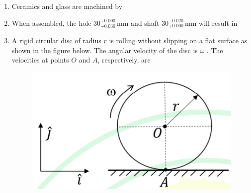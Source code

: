 \documentclass[journal]{IEEEtran}
\begin{document}
\begin{enumerate}[leftmargin=0pt]
\item
Ceramics and glass are machined by

\vspace{0.2cm}
\begin{enumerate}
\end{enumerate}
\hfill{}

\item
When assembled, the hole $30^{+0.000}_{+0.030}\,\text{mm}$ and shaft $30^{-0.020}_{+0.000}\,\text{mm}$ will result in

\vspace{0.2cm}
\begin{enumerate}
\end{enumerate}
\hfill{}

\item
A rigid circular disc of radius $r$  is rolling without slipping on a flat surface as shown in the figure below. The angular velocity of the disc is $\omega$ . The velocities  at points $O$ and $A$, respectively, are
\begin{figure}[H]\includegraphics[width=0.5\columnwidth]{Figs/image (98).png}\caption*{}\label{fig:q26}\end{figure}
\vspace{0.2cm}
\begin{enumerate}
\end{enumerate}
\hfill{}


\end{enumerate}
\end{document}
